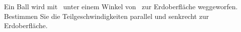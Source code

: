 Ein Ball wird mit \vabO\ unter einem Winkel von \alO\ zur Erdoberfläche weggeworfen. Bestimmen Sie die Teilgeschwindigkeiten parallel und senkrecht zur Erdoberfläche.
